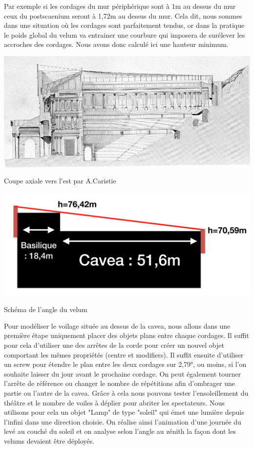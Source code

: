 Par exemple si les cordages du mur périphérique sont à 1m au dessus du mur ceux du \gls{postscaenium} seront à 1,72m au dessus du mur. Cela dit, nous sommes dans une situation où les cordages sont parfaitement tendus, or dans la pratique le poids global du velum va entrainer une courbure qui imposera de surélever les accroches des cordages. Nous avons donc calculé ici une hauteur minimum. 
 \begin{figureth}
	\begin{subfigureth}{0.49\textwidth}
		\includegraphics[width=\linewidth]{images/velum2}
	\caption[Coupe axiale vers l'est par A.Caristie]{Coupe axiale vers l'est par A.Caristie \footnotemark} 
	\label{velum2} 
	\end{subfigureth}	
	\begin{subfigureth}{0.49\textwidth}
		\includegraphics[width=\linewidth]{images/dessinvelum}
		\caption{Schéma de l'angle du velum}
		\label{dessinvelum} 		
	\end{subfigureth}	
\end{figureth}

Pour modéliser le voilage située au dessus de la \gls{cavea}, nous allons dans une première étape uniquement placer des objets plans entre chaque cordages. Il suffit pour cela d'utiliser une des arrêtes de la corde pour créer un nouvel objet comportant les mêmes propriétés (centre et \glspl{modifier}). Il suffit ensuite d'utiliser un \gls{screw} pour étendre le plan entre les deux cordages sur 2,79°, ou moins, si l'on souhaite laisser du jour avant le prochaine cordage. On peut également tourner l'arrête de référence ou changer le nombre de répétitions afin d'ombrager une partie ou l'autre de la \gls{cavea}. Grâce à cela nous pouvons tester l'ensoleillement du théâtre et le nombre de voiles à déplier pour abriter les spectateurs. Nous utilisons pour cela un objet "Lamp" de type "soleil" qui émet une lumière depuis l'infini dans une direction choisie. On réalise ainsi l'animation d'une journée du levé au couché du soleil et on analyse selon l'angle au zénith la façon dont les \glspl{velum} devaient être déployés.


